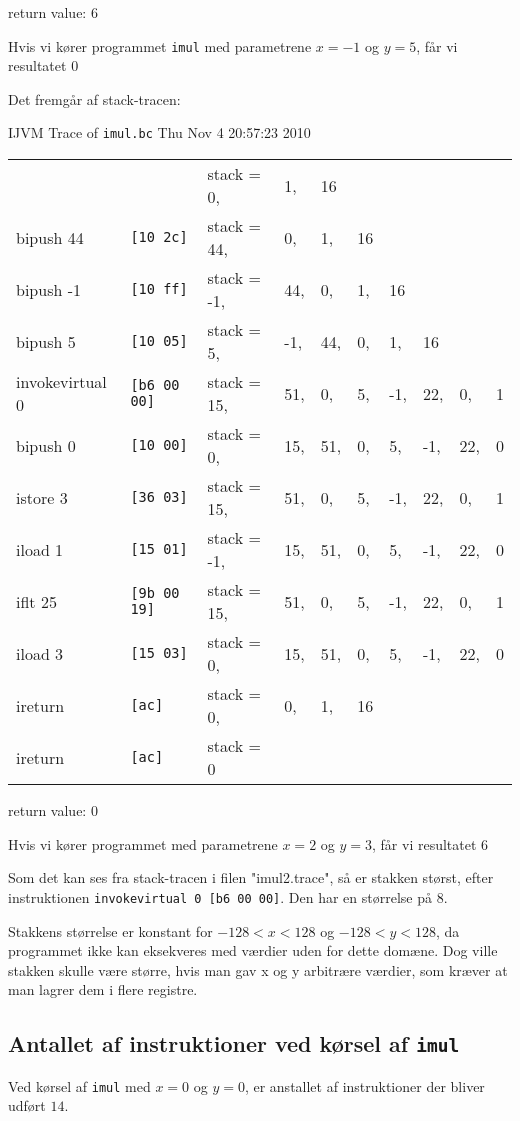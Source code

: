 \documentclass[12pt,a4paper]{article}
\newcommand{\imul}{\texttt{imul}}
\begin{document}
return value: 6

Hvis vi kører programmet \imul{} med parametrene $x=-1$ og $y=5$, får vi resultatet $0$

Det fremgår af stack-tracen:

IJVM Trace of \texttt{imul.bc} Thu Nov  4 20:57:23 2010

\begin{tabular}{llllllllll}
                &                    & stack = 0,& 1,& 16 \\
bipush 44       & \texttt{[10 2c]   }& stack = 44,& 0,& 1,& 16 \\
bipush -1       & \texttt{[10 ff]   }& stack = -1,& 44,& 0,& 1,& 16 \\
bipush 5        & \texttt{[10 05]   }& stack = 5,& -1,& 44,& 0,& 1,& 16 \\
invokevirtual 0 & \texttt{[b6 00 00]}& stack = 15,& 51,& 0,& 5,& -1,& 22,& 0,& 1 \\
bipush 0        & \texttt{[10 00]   }& stack = 0,& 15,& 51,& 0,& 5,& -1,& 22,& 0 \\
istore 3        & \texttt{[36 03]   }& stack = 15,& 51,& 0,& 5,& -1,& 22,& 0,& 1 \\
iload 1         & \texttt{[15 01]   }& stack = -1,& 15,& 51,& 0,& 5,& -1,& 22,& 0 \\
iflt 25         & \texttt{[9b 00 19]}& stack = 15,& 51,& 0,& 5,& -1,& 22,& 0,& 1 \\
iload 3         & \texttt{[15 03]   }& stack = 0,& 15,& 51,& 0,& 5,& -1,& 22,& 0 \\
ireturn         & \texttt{[ac]      }& stack = 0,& 0,& 1,& 16 \\
ireturn         & \texttt{[ac]      }& stack = 0
\end{tabular}

return value: $0$


Hvis vi kører programmet med parametrene $x=2$ og $y=3$, får vi resultatet $6$

Som det kan ses fra stack-tracen i filen "imul2.trace", så er stakken størst, efter instruktionen \texttt{invokevirtual 0 [b6 00 00]}. Den har en størrelse på $8$.

Stakkens størrelse er konstant for $-128 < x < 128$ og $-128 < y < 128$, da programmet ikke kan eksekveres med værdier uden for dette domæne. Dog ville stakken skulle være større, hvis man gav x og y arbitrære værdier, som kræver at man lagrer dem i flere registre.

\subsection{Antallet af instruktioner ved kørsel af \imul{}}
Ved kørsel af \imul{} med $x=0$ og $y=0$, er anstallet af instruktioner der bliver udført $14$.
\end{document}
